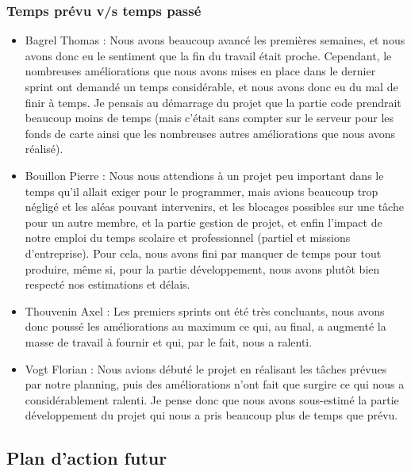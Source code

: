 \documentclass[a4paper, 12pt]{report}
\begin{document}
\subsubsection*{Temps prévu v/s temps passé}

\begin{itemize}

\item
  Bagrel Thomas :
  Nous avons beaucoup avancé les premières semaines, et nous avons donc eu le sentiment que la fin du travail était proche. Cependant, le nombreuses améliorations que nous avons mises en place dans le dernier sprint ont demandé un temps considérable, et nous avons donc eu du mal de finir à temps. Je pensais au démarrage du projet que la partie code prendrait beaucoup moins de temps (mais c’était sans compter sur le serveur pour les fonds de carte ainsi que les nombreuses autres améliorations que nous avons réalisé).

\item
  Bouillon Pierre :
  Nous nous attendions à un projet peu important dans le temps qu'il allait exiger pour le programmer, mais avions beaucoup trop négligé et les aléas pouvant intervenirs, et les blocages possibles sur une tâche pour un autre membre, et la partie gestion de projet, et enfin l'impact de notre emploi du temps scolaire et professionnel (partiel et missions d'entreprise).
  Pour cela, nous avons fini par manquer de temps pour tout produire, même si, pour la partie développement, nous avons plutôt bien respecté nos estimations et délais.
 
\item
  Thouvenin Axel :
  Les premiers sprints ont été très concluants, nous avons donc poussé les améliorations au maximum ce qui, au final, a augmenté la masse de travail à fournir et qui, par le fait, nous a ralenti.

\item
  Vogt Florian :
  Nous avions débuté le projet en réalisant les tâches prévues par notre planning, puis des améliorations n'ont fait que surgire ce qui nous a considérablement ralenti. Je pense donc que nous avons sous-estimé la partie développement du projet qui nous a pris beaucoup plus de temps que prévu.

\end{itemize}

\subsection*{Plan d'action futur}
\end{document}
